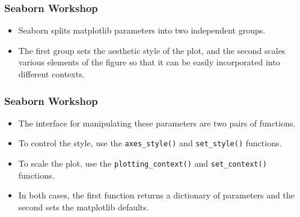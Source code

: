 \documentclass{beamer}
\begin{document}
\begin{frame}[fragile]
	\frametitle{Seaborn Workshop}
	\large
\begin{itemize}
\item Seaborn splits matplotlib parameters into two independent groups. 
\item The first group sets the aesthetic style of the plot, and the second scales various elements of the figure so that it can be easily incorporated into different contexts.
\end{itemize}

\end{frame}
\begin{frame}[fragile]
	\frametitle{Seaborn Workshop}
	\large
	\begin{itemize}
\item The interface for manipulating these parameters are two pairs of functions.
\item  To control the style, use the \texttt{axes\_style()} and \texttt{set\_style()} functions.
\item  To scale the plot, use the \texttt{plotting\_context()} and \texttt{set\_context()} functions.\
\item In both cases, the first function returns a dictionary of parameters and the second sets the matplotlib defaults.
	\end{itemize}


\end{frame}
\end{document}
